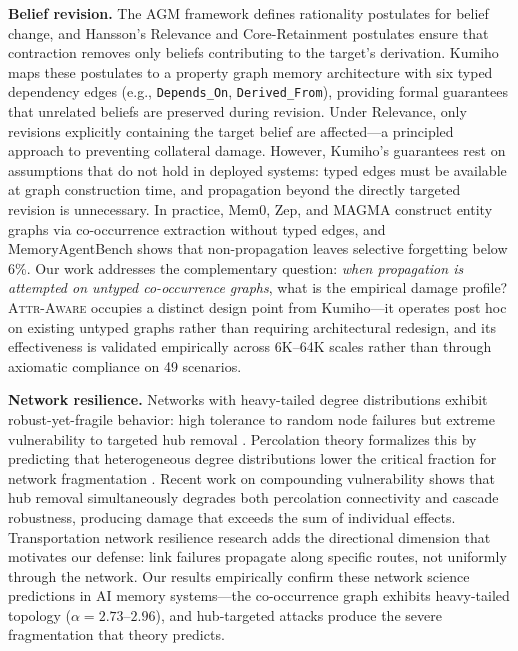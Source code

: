 \documentclass[11pt]{article}
\newcommand{\attraware}{\textsc{Attr-Aware}}
\begin{document}
\textbf{Belief revision.}
The AGM framework \citep{agm_1985} defines rationality postulates for belief change, and Hansson's Relevance and Core-Retainment postulates \citep{hansson_1999} ensure that contraction removes only beliefs contributing to the target's derivation.
Kumiho \citep{kumiho_2026} maps these postulates to a property graph memory architecture with six typed dependency edges (e.g., \texttt{Depends\_On}, \texttt{Derived\_From}), providing formal guarantees that unrelated beliefs are preserved during revision.
Under Relevance, only revisions explicitly containing the target belief are affected---a principled approach to preventing collateral damage.
However, Kumiho's guarantees rest on assumptions that do not hold in deployed systems: typed edges must be available at graph construction time, and propagation beyond the directly targeted revision is unnecessary.
In practice, Mem0, Zep, and MAGMA construct entity graphs via co-occurrence extraction without typed edges, and MemoryAgentBench shows that non-propagation leaves selective forgetting below 6\%.
Our work addresses the complementary question: \textit{when propagation is attempted on untyped co-occurrence graphs}, what is the empirical damage profile?
\attraware{} occupies a distinct design point from Kumiho---it operates post hoc on existing untyped graphs rather than requiring architectural redesign, and its effectiveness is validated empirically across 6K--64K scales rather than through axiomatic compliance on 49 scenarios.

\textbf{Network resilience.}
Networks with heavy-tailed degree distributions exhibit robust-yet-fragile behavior: high tolerance to random node failures but extreme vulnerability to targeted hub removal \citep{albert_attack_2000, barabasi_scalefree_1999}.
Percolation theory formalizes this by predicting that heterogeneous degree distributions lower the critical fraction for network fragmentation \citep{cohen_percolation_2000, molloy_reed_1995}.
Recent work on compounding vulnerability \citep{compounding_vulnerability_2026} shows that hub removal simultaneously degrades both percolation connectivity and cascade robustness, producing damage that exceeds the sum of individual effects.
Transportation network resilience research \citep{chen_network_2007} adds the directional dimension that motivates our defense: link failures propagate along specific routes, not uniformly through the network.
Our results empirically confirm these network science predictions in AI memory systems---the co-occurrence graph exhibits heavy-tailed topology ($\alpha = 2.73$--$2.96$), and hub-targeted attacks produce the severe fragmentation that theory predicts.
\end{document}
